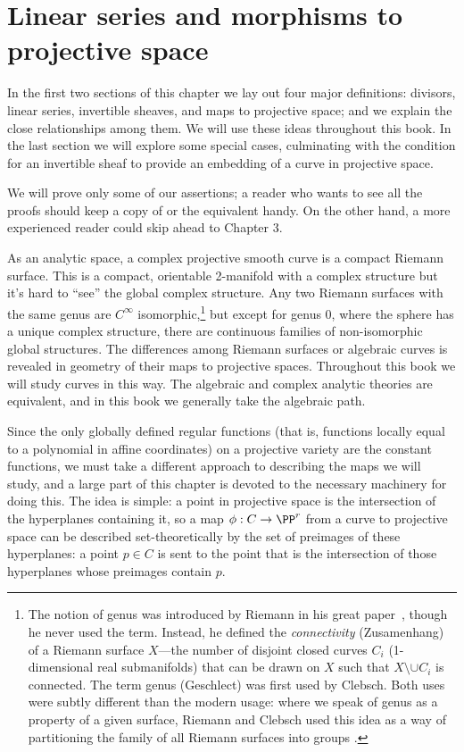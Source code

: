 

\chapter{Linear series and morphisms to projective space}\label{linear series}

In the first two sections of this chapter we lay out four major definitions:
divisors, linear series, invertible sheaves, and maps to projective space; and
we explain the close relationships among them. We will use these ideas throughout
this book. In the last section we will explore some special cases, culminating with
the condition for an invertible sheaf to provide an embedding of a curve in projective space.

We will prove only some of our assertions; a reader who wants to see all the proofs should keep a copy of \cite{Hartshorne1977} or the equivalent handy. On the other hand, a more experienced reader
could skip ahead to Chapter 3.

As an analytic space, a complex projective smooth curve is a compact Riemann surface. This is a compact, orientable 2-manifold with a complex structure but it's hard to ``see'' the global complex structure. Any two Riemann surfaces with the same genus are $C^\infty$ isomorphic,\footnote{The notion of genus was introduced by Riemann in his great paper~\cite{Riemann}, though he never used the term. Instead,
he defined the \emph{connectivity} (Zusamenhang) of a Riemann surface $X$---the number of disjoint closed curves $C_i$ (1-dimensional real submanifolds) that can be drawn on $X$ such that $X\setminus \cup C_i$ is connected. The term genus (Geschlect) was first used by Clebsch. Both uses
were subtly different than the modern usage: where we speak of genus as a property of a given surface, Riemann and Clebsch
used this idea as a way of partitioning the family of all Riemann surfaces into groups \cite{MR4175877}. }
but except for genus 0, where the sphere has a unique complex structure,
there are continuous families of non-isomorphic global structures.  The differences among Riemann surfaces or algebraic curves is revealed in  geometry of their maps to projective spaces. Throughout this book we will study curves in this way. The algebraic and
complex analytic theories are equivalent, and in this book we generally take the algebraic path.

Since the only  globally defined regular functions (that is, functions locally equal to a polynomial in affine coordinates) on a projective variety are the constant functions, we must take a different approach to describing the maps we will study, and a large part of this chapter is devoted to the necessary machinery for doing this. The idea is simple: a point in projective space is the intersection of the hyperplanes containing it, so a map $\phi: C\to \PP^r$ from a curve to projective space can be described set-theoretically
by the set of preimages of these hyperplanes: a point $p\in C$ is sent to the point
that is the intersection of those hyperplanes whose preimages contain $p$.
 
